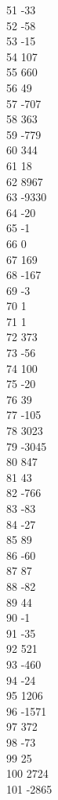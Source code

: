 { 51	-33 \\
 52	-58 \\
 53	-15 \\
 54	107 \\
 55	660 \\
 56	49 \\
 57	-707 \\
 58	363 \\
 59	-779 \\
 60	344 \\
 61	18 \\
 62	8967 \\
 63	-9330 \\
 64	-20 \\
 65	-1 \\
 66	0 \\
 67	169 \\
 68	-167 \\
 69	-3 \\
 70	1 \\
 71	1 \\
 72	373 \\
 73	-56 \\
 74	100 \\
 75	-20 \\
 76	39 \\
 77	-105 \\
 78	3023 \\
 79	-3045 \\
 80	847 \\
 81	43 \\
 82	-766 \\
 83	-83 \\
 84	-27 \\
 85	89 \\
 86	-60 \\
 87	87 \\
 88	-82 \\
 89	44 \\
 90	-1 \\
 91	-35 \\
 92	521 \\
 93	-460 \\
 94	-24 \\
 95	1206 \\
 96	-1571 \\
 97	372 \\
 98	-73 \\
 99	25 \\
 100	2724 \\
 101	-2865 \\
}

